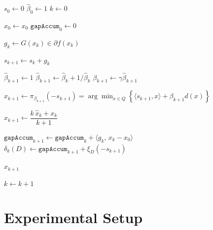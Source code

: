 \documentclass[12pt,a4paper]{article}
\begin{document}
\begin{algorithm}[H]
\caption{Simple Dual Averaging (SDA) with support-form gap}
\label{alg:sda-impl-friendly}
\begin{algorithmic}[1]


\State $s_0 \gets 0$
\State $\hat\beta_0 \gets 1$
\State $k \gets 0$

\State $\hat x_{0} \gets x_0$ 
\State $\texttt{gapAccum}_0 \gets 0$


  \State $g_k \gets G(x_k)\in \partial f(x_k)$

  \State $s_{k+1} \gets s_k + g_k$ 

   
    \State $\hat\beta_{k+1} \gets 1$
  \Else
    \State $\hat\beta_{k+1} \gets \hat\beta_k + 1/\hat\beta_k$
  \EndIf
  \State $\beta_{k+1} \gets \gamma \hat\beta_{k+1}$

  \State $x_{k+1} \gets \pi_{\beta_{k+1}}(-s_{k+1})
  = \arg\min_{x\in Q}\left\{\langle s_{k+1},x\rangle + \beta_{k+1} d(x)\right\}$ 

  \State $\hat x_{k+1} \gets \dfrac{k\,\hat x_k + x_k}{k+1}$ 

  \State $\texttt{gapAccum}_{k+1} \gets \texttt{gapAccum}_k + \langle g_k,\, x_k - x_0\rangle$ 
  \State $\delta_k(D) \gets \texttt{gapAccum}_{k+1} + \xi_D(-s_{k+1})$

    \State \Return $\hat x_{k+1}$
  \EndIf

  \State $k \gets k+1$

\EndWhile

\end{algorithmic}
\end{algorithm}


\section{Experimental Setup}
\end{document}
